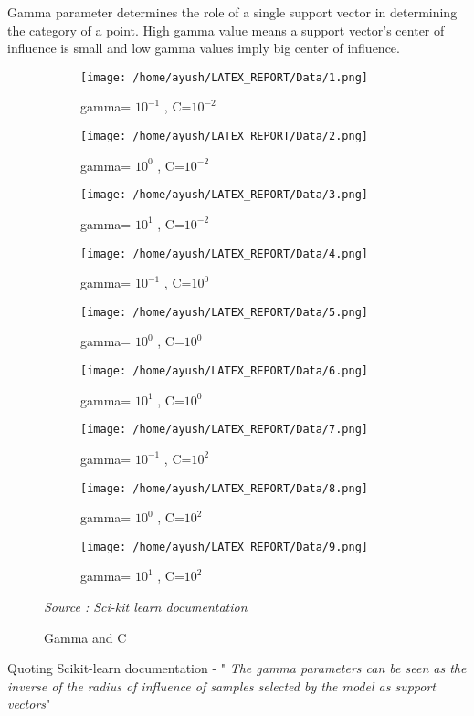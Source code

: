 \documentclass{report}
\begin{document}
\begin{enumerate}
Gamma parameter determines the role of a single support vector in determining the category of a point.
High gamma value means a support vector's center of influence is small and low gamma values imply big center of influence.
\begin{figure}[!h]
\centering
\begin{subfigure}[]{0.3\textwidth}
  \texttt{[image: /home/ayush/LATEX\_REPORT/Data/1.png]}
  \caption{gamma= \(10^{-1} \) , C=\(10^{-2} \)}
  \label{Fig:2}
\end{subfigure}
\begin{subfigure}[]{0.3\textwidth}
  \texttt{[image: /home/ayush/LATEX\_REPORT/Data/2.png]}
  \caption{gamma= \(10^{0} \) , C=\(10^{-2} \)}
  \label{Fig:2}
\end{subfigure}
\begin{subfigure}[]{0.3\textwidth}
  \texttt{[image: /home/ayush/LATEX\_REPORT/Data/3.png]}
  \caption{gamma= \(10^{1} \) , C=\(10^{-2} \)}
  \label{Fig:2}
\end{subfigure}

\begin{subfigure}[]{0.3\textwidth}
  \texttt{[image: /home/ayush/LATEX\_REPORT/Data/4.png]}
  \caption{gamma= \(10^{-1} \) , C=\(10^{0} \)}
  \label{Fig:2}
\end{subfigure}
\begin{subfigure}[]{0.3\textwidth}
  \texttt{[image: /home/ayush/LATEX\_REPORT/Data/5.png]}
  \caption{gamma= \(10^{0} \) , C=\(10^{0} \)}
  \label{Fig:2}
\end{subfigure}
\begin{subfigure}[]{0.3\textwidth}
  \texttt{[image: /home/ayush/LATEX\_REPORT/Data/6.png]}
  \caption{gamma= \(10^{1} \) , C=\(10^{0} \)}
  \label{Fig:2}
\end{subfigure}
\begin{subfigure}[]{0.3\textwidth}
  \texttt{[image: /home/ayush/LATEX\_REPORT/Data/7.png]}
  \caption{gamma= \(10^{-1} \) , C=\(10^{2} \)}
  \label{Fig:2}
\end{subfigure}
\begin{subfigure}[]{0.3\textwidth}
  \texttt{[image: /home/ayush/LATEX\_REPORT/Data/8.png]}
  \caption{gamma= \(10^{0} \) , C=\(10^{2} \)}
  \label{Fig:2}
\end{subfigure}
\begin{subfigure}[]{0.3\textwidth}
  \texttt{[image: /home/ayush/LATEX\_REPORT/Data/9.png]}
  \caption{gamma= \(10^{1} \) , C=\(10^{2} \)}
  \label{Fig:2}
\end{subfigure}
\caption{ Gamma and C}
\emph{\normalsize Source : Sci-kit learn documentation}
\end{figure}
\end{enumerate}
\Large
\pagebreak
Quoting Scikit-learn documentation - " \emph{The gamma parameters can be seen as the inverse of the radius of influence of samples selected by the model as support vectors}"
\linebreak
 
\end{document}
